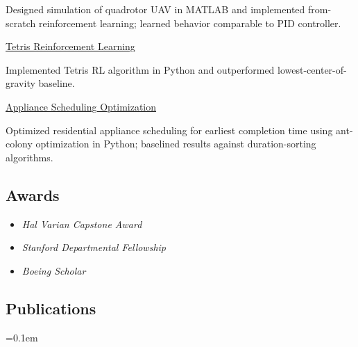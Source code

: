 \documentclass[10pt,letterpaper]{article}
\begin{document}
\begin{paracol}{2}
\begin{leftcolumn}
        \begin{adjustwidth}{2.5em}{}
        Designed simulation of quadrotor UAV in MATLAB and implemented from-scratch reinforcement learning; learned behavior comparable to PID controller.
        \end{adjustwidth}

    \href{https://github.com/mpaluta/Tetris-Reinforcement-Learning/blob/master/Reinforcement\%20Learning\%20for\%20Tetris.pdf}{Tetris Reinforcement Learning}

        \begin{adjustwidth}{2.5em}{}
        Implemented Tetris RL algorithm in Python and outperformed lowest-center-of-gravity baseline.
        \end{adjustwidth}

    \href{https://github.com/mpaluta/Ant-Colony-Optimization/blob/master/Ant\%20Colony\%20Optimization.pdf}{Appliance Scheduling Optimization}

        \begin{adjustwidth}{2.5em}{}
        Optimized residential appliance scheduling for earliest completion time using ant-colony optimization in Python; baselined results against duration-sorting algorithms.
        \end{adjustwidth}

\end{leftcolumn}
\begin{rightcolumn}

\subsection*{Awards}

    \begin{itemize}[label={--}, leftmargin={.15in}, rightmargin={.2in}]
    	\parskip=0.1em

    	\item
    		\emph{Hal Varian Capstone Award}
    	\item
    		\emph{Stanford Departmental Fellowship}
    	\item
    		\emph{Boeing Scholar}

    \end{itemize}

\subsection*{Publications}

    \begin{itemize}[label={--}, leftmargin={.15in}, rightmargin={.2in}]
    	\parskip=0.1em


\end{itemize}
\end{rightcolumn}
\end{paracol}
\end{document}
